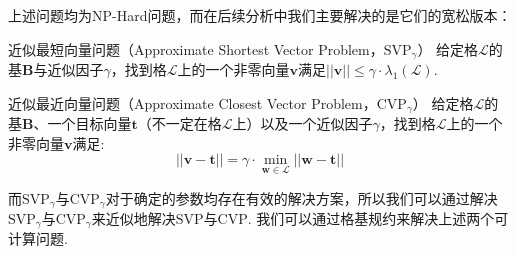 \documentclass{book}
\numberwithin{equation}{subsubsection}
\begin{document}
上述问题均为NP-Hard问题，而在后续分析中我们主要解决的是它们的宽松版本：

\begin{concept}{近似最短向量问题（Approximate Shortest Vector Problem，$\text{SVP}_{\gamma}$）}
    给定格$\mathcal{L}$的基$\pmb{B}$与近似因子$\gamma$，找到格$\mathcal{L}$上的一个非零向量$\pmb{v}$满足$||\pmb{v}||\le\gamma\cdot\lambda_1(\mathcal{L})$.
\end{concept}

\begin{concept}{近似最近向量问题（Approximate Closest Vector Problem，$\text{CVP}_{\gamma}$）}
    给定格$\mathcal{L}$的基$\pmb{B}$、一个目标向量$\pmb{t}$（不一定在格$\mathcal{L}$上）以及一个近似因子$\gamma$，找到格$\mathcal{L}$上的一个非零向量$\pmb{v}$满足:
    \begin{equation}
        ||\pmb{v}-\pmb{t}||=\gamma\cdot\min_{\pmb{w}\in\mathcal{L}}||\pmb{w}-\pmb{t}||
        \nonumber
    \end{equation}
\end{concept}

而$\text{SVP}_{\gamma}$与$\text{CVP}_{\gamma}$对于确定的参数均存在有效的解决方案，所以我们可以通过解决$\text{SVP}_{\gamma}$与$\text{CVP}_{\gamma}$来近似地解决$\text{SVP}$与$\text{CVP}$.
我们可以通过格基规约来解决上述两个可计算问题.
\end{document}
